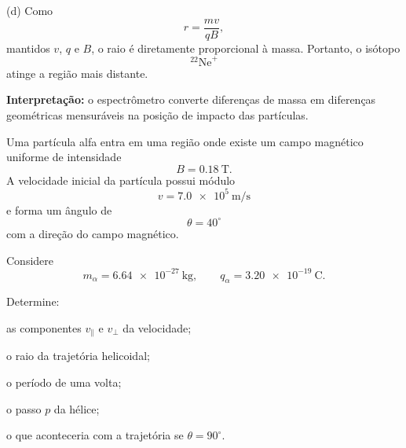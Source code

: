 \begin{questao}[4]{}
{(d) Como
\[
r=\frac{mv}{qB},
\]
mantidos $v$, $q$ e $B$, o raio é diretamente proporcional à massa. Portanto,
o isótopo
\[
\boxed{^{22}\mathrm{Ne}^{+}}
\]
atinge a região mais distante.

\textbf{Interpretação:} o espectrômetro converte diferenças de massa em
diferenças geométricas mensuráveis na posição de impacto das partículas.
}

\end{questao}



\begin{questao}[4]{}

Uma partícula alfa entra em uma região onde existe um campo magnético uniforme
de intensidade
\[
B=\SI{0.18}{\tesla}.
\]
A velocidade inicial da partícula possui módulo
\[
v=\SI{7.0e5}{\meter\per\second}
\]
e forma um ângulo de
\[
\theta=40^\circ
\]
com a direção do campo magnético.

Considere
\[
m_\alpha=\SI{6.64e-27}{\kilogram},
\qquad
q_\alpha=\SI{3.20e-19}{\coulomb}.
\]

Determine:

\begin{itensq}
    \item as componentes $v_{\parallel}$ e $v_{\perp}$ da velocidade;
    \item o raio da trajetória helicoidal;
    \item o período de uma volta;
    \item o passo $p$ da hélice;
    \item o que aconteceria com a trajetória se $\theta=90^\circ$.
\end{itensq}

\begin{center}
\end{center}
\end{questao}
